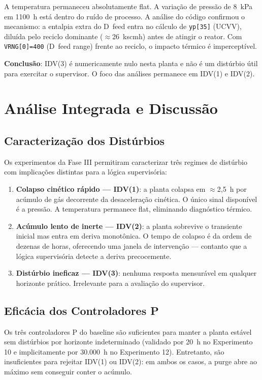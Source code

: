 A temperatura permaneceu absolutamente flat. A variação de pressão de 8~kPa em 1100~h está dentro do ruído de processo. A análise do código confirmou o mecanismo: a entalpia extra do D~feed entra no cálculo de \texttt{yp[35]} (UCVV), diluída pelo reciclo dominante ($\approx$26~kscmh) antes de atingir o reator. Com \texttt{VRNG[0]=400} (D~feed range) frente ao reciclo, o impacto térmico é imperceptível.

\textbf{Conclusão}: IDV(3) é numericamente nulo nesta planta e não é um distúrbio útil para exercitar o supervisor. O foco das análises permanece em IDV(1) e IDV(2).

\section{Análise Integrada e Discussão}
\label{sec:analise}

\subsection{Caracterização dos Distúrbios}

Os experimentos da Fase III permitiram caracterizar três regimes de distúrbio com implicações distintas para a lógica supervisória:

\begin{enumerate}
  \item \textbf{Colapso cinético rápido — IDV(1)}: a planta colapsa em $\approx$2,5~h por acúmulo de gás decorrente da desaceleração cinética. O único sinal disponível é a pressão. A temperatura permanece flat, eliminando diagnóstico térmico.
  \item \textbf{Acúmulo lento de inerte — IDV(2)}: a planta sobrevive o transiente inicial mas entra em deriva monotônica. O tempo de colapso é da ordem de dezenas de horas, oferecendo uma janela de intervenção — contanto que a lógica supervisória detecte a deriva precocemente.
  \item \textbf{Distúrbio ineficaz — IDV(3)}: nenhuma resposta mensurável em qualquer horizonte prático. Irrelevante para a avaliação do supervisor.
\end{enumerate}

\subsection{Eficácia dos Controladores P}

Os três controladores P do baseline são suficientes para manter a planta estável sem distúrbios por horizonte indeterminado (validado por 20~h no Experimento 10 e implicitamente por 30.000~h no Experimento 12). Entretanto, são insuficientes para rejeitar IDV(1) ou IDV(2): em ambos os casos, a purge abre ao máximo sem conseguir conter o acúmulo.

